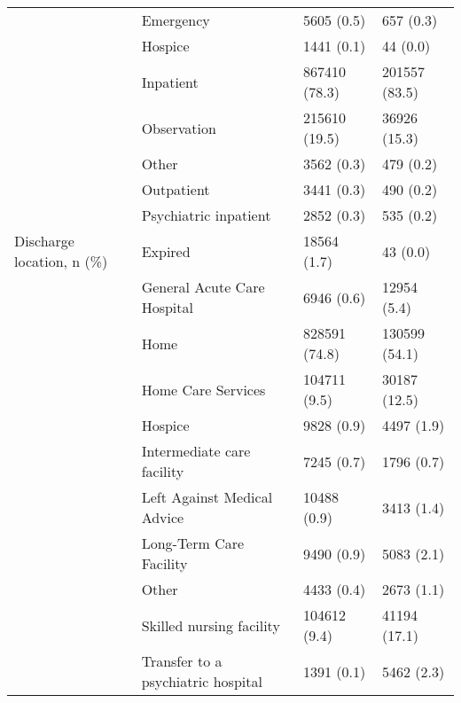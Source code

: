 \begin{tabular}{llll}
                                       & Emergency &               5605 (0.5) &         657 (0.3) \\
                                       & Hospice &               1441 (0.1) &          44 (0.0) \\
                                       & Inpatient &            867410 (78.3) &     201557 (83.5) \\
                                       & Observation &            215610 (19.5) &      36926 (15.3) \\
                                       & Other &               3562 (0.3) &         479 (0.2) \\
                                       & Outpatient &               3441 (0.3) &         490 (0.2) \\
                                       & Psychiatric inpatient &               2852 (0.3) &         535 (0.2) \\
Discharge location, n (\%) & Expired &              18564 (1.7) &          43 (0.0) \\
                                       & General Acute Care Hospital &               6946 (0.6) &       12954 (5.4) \\
                                       & Home &            828591 (74.8) &     130599 (54.1) \\
                                       & Home Care Services &             104711 (9.5) &      30187 (12.5) \\
                                       & Hospice &               9828 (0.9) &        4497 (1.9) \\
                                       & Intermediate care facility &               7245 (0.7) &        1796 (0.7) \\
                                       & Left Against Medical Advice &              10488 (0.9) &        3413 (1.4) \\
                                       & Long-Term Care Facility &               9490 (0.9) &        5083 (2.1) \\
                                       & Other &               4433 (0.4) &        2673 (1.1) \\
                                       & Skilled nursing facility &             104612 (9.4) &      41194 (17.1) \\
                                       & Transfer to a psychiatric hospital &               1391 (0.1) &        5462 (2.3) \\

\end{tabular}
